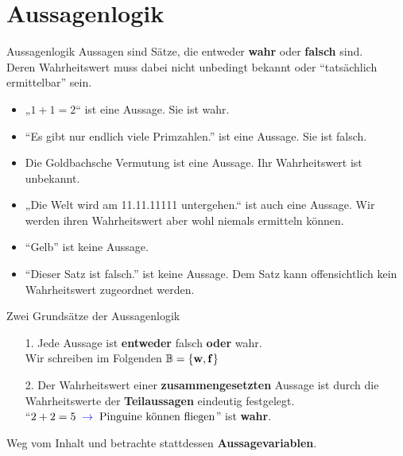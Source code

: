 \section{Aussagenlogik}

\begin{frame}{Aussagenlogik}
	Aussagen sind Sätze, die entweder \textbf{wahr} oder \textbf{falsch} sind.\\
	Deren Wahrheitswert muss dabei nicht unbedingt bekannt oder \enquote{tatsächlich ermittelbar} sein.
	
	\pause
	\begin{Beispiel}
		\begin{itemize}
			\item „$ 1 + 1 = 2 $“ ist eine Aussage. Sie ist wahr.
			\item \enquote{Es gibt nur endlich viele Primzahlen.} ist eine Aussage. Sie ist falsch.
			\pause
			\item Die Goldbachsche Vermutung ist eine Aussage. Ihr Wahrheitswert ist unbekannt.
			\pause
			\item „Die Welt wird am 11.11.11111 untergehen.“ ist auch eine Aussage. Wir werden ihren Wahrheitswert aber wohl niemals ermitteln können.
			\pause
			\item \enquote{Gelb} ist keine Aussage.
			\pause
			\item \enquote{Dieser Satz ist falsch.} ist keine Aussage. Dem Satz kann offensichtlich kein Wahrheitswert zugeordnet werden.
		\end{itemize}
	\end{Beispiel}
\end{frame}

\begin{frame}{Zwei Grundsätze der Aussagenlogik}
	
	\begin{itemize}
		\pause
		\item[1.] Jede Aussage ist \textbf{entweder} falsch \textbf{oder} wahr.\\
		Wir schreiben im Folgenden $\mathbb{B}= \{\hbox{\textbf{w}}, \hbox{\textbf{f}}\}$
		\pause
		\item[2.] Der Wahrheitswert einer \textbf{zusammengesetzten} Aussage ist durch die
		Wahrheitswerte der \textbf{Teilaussagen} eindeutig festgelegt. \\
		\enquote{$2 + 2 = 5 \; \mathrel{\textcolor{blue}{\to}} \; \text{Pinguine können fliegen}$} ist \textbf{wahr}.\\[0.2em]
	\end{itemize}

	\impl Weg vom Inhalt und betrachte stattdessen \textbf{Aussagevariablen}.
\end{frame}

